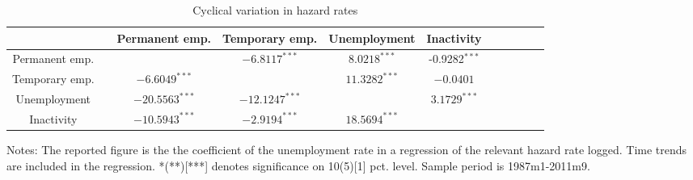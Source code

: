 \begin{table}[h]
	\caption{Cyclical variation in hazard rates}
	\label{tab:flow_cyc}
	\begin{tabularx}{\linewidth}{cXccccccccc}
	\toprule[1pt] 
	             && Permanent emp. & Temporary emp.     & Unemployment   & Inactivity  \\ \hline 
Permanent emp. &&                &  $-6.8117^{***}$   & $ 8.0218^{***}$ & -0.9282$^{***}$ \\
Temporary emp. &&  $-6.6049^{***}$     &                    &$11.3282^{***}$        &$-0.0401$ \\
Unemployment   &&  $-20.5563^{***}$     & $-12.1247^{***}$          &                &$ 3.1729^{***}$ \\ 
Inactivity   && $ -10.5943^{***}$      & $-2.9194 ^{***}$        & $18.5694^{***}$         &  \\
	\bottomrule[1pt]
	\end{tabularx}
	\begin{minipage}{\linewidth}
		\footnotesize{Notes: The reported figure is the the coefficient of the unemployment rate in a regression of the relevant hazard rate logged. Time trends are included in the regression. *(**)[***] denotes significance on 10(5)[1] pct. level. Sample period is 1987m1-2011m9.}
	\end{minipage}
\end{table}	
